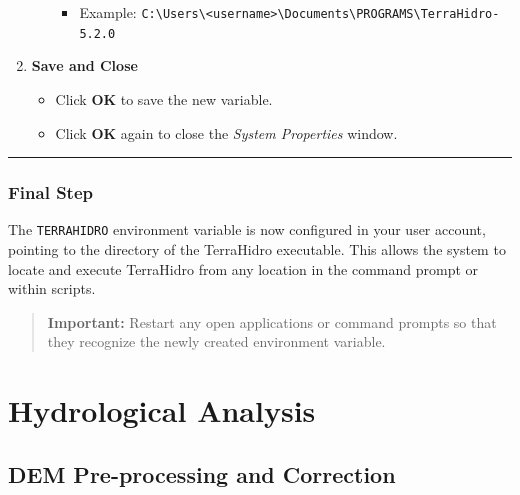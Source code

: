 \documentclass[
]{book}
\providecommand{\tightlist}{%
  \setlength{\itemsep}{0pt}\setlength{\parskip}{0pt}}
\begin{document}
\begin{enumerate}
\begin{itemize}
    \begin{itemize}
    \tightlist
    \item
      Example: \texttt{C:\textbackslash{}Users\textbackslash{}\textless{}username\textgreater{}\textbackslash{}Documents\textbackslash{}PROGRAMS\textbackslash{}TerraHidro-5.2.0}
    \end{itemize}
  \end{itemize}
\item
  \textbf{Save and Close}

  \begin{itemize}
  \tightlist
  \item
    Click \textbf{OK} to save the new variable.\\
  \item
    Click \textbf{OK} again to close the \emph{System Properties} window.
  \end{itemize}
\end{enumerate}

\begin{center}\rule{0.5\linewidth}{0.5pt}\end{center}

\subsection*{Final Step}\label{final-step}

The \texttt{TERRAHIDRO} environment variable is now configured in your user account, pointing to the directory of the TerraHidro executable. This allows the system to locate and execute TerraHidro from any location in the command prompt or within scripts.

\begin{quote}
\textbf{Important:} Restart any open applications or command prompts so that they recognize the newly created environment variable.
\end{quote}

\chapter{Hydrological Analysis}\label{hydrological-analysis}

\section{DEM Pre-processing and Correction}\label{DEM-Pre-processing-and-Correction}
\end{document}
